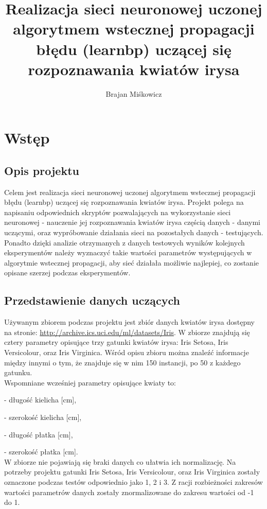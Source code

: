 \documentclass[a4paper, 12pt]{article}
\author{Brajan Miśkowicz}
\title{Realizacja sieci neuronowej uczonej algorytmem wstecznej propagacji błędu (learnbp) uczącej się rozpoznawania kwiatów irysa}
\begin{document}
\maketitle

\blankpage

\tableofcontents

\clearpage
\blankpage

\section{Wstęp}
\subsection {Opis projektu}
Celem jest realizacja sieci neuronowej uczonej algorytmem wstecznej propagacji błędu (learnbp) uczącej się rozpoznawania kwiatów irysa. Projekt polega na napisaniu odpowiednich skryptów pozwalających na wykorzystanie sieci neuronowej - nauczenie jej rozpoznawania kwiatów irysa częścią danych - danymi uczącymi, oraz wypróbowanie działania sieci na pozostałych danych - testujących. Ponadto dzięki analizie otrzymanych z danych testowych wyników kolejnych eksperymentów należy wyznaczyć takie wartości parametrów występujących w algorytmie wstecznej propagacji, aby sieć działała możliwie najlepiej, co zostanie opisane szerzej podczas eksperymentów.

\subsection {Przedstawienie danych uczących}
Używanym zbiorem podczas projektu jest zbiór danych kwiatów irysa dostępny na stronie: \url {http://archive.ics.uci.edu/ml/datasets/Iris}. W zbiorze znajdują się cztery parametry opisujące trzy gatunki kwiatów irysa: Iris Setosa, Iris Versicolour, oraz Iris Virginica. Wśród opisu zbioru można znaleźć informacje między innymi o tym, że znajduje się w nim 150 instancji, po 50 z każdego gatunku. \\ Wspomniane wcześniej parametry opisujące kwiaty to:

- długość kielicha [cm],

- szerokość kielicha [cm],

- długość płatka [cm],

- szerokość płatka [cm].\\
W zbiorze nie pojawiają się braki danych co ułatwia ich normalizację. Na potrzeby projektu gatunki Iris Setosa, Iris Versicolour, oraz Iris Virginica zostały oznaczone podczas testów odpowiednio jako 1, 2 i 3. Z racji rozbieżności zakresów wartości parametrów danych zostały znormalizowane do zakresu wartości od -1 do 1.
\newpage
\end{document}
